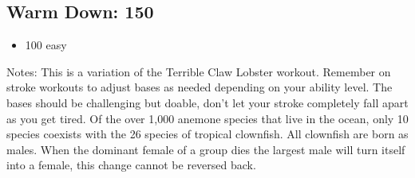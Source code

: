 \documentclass{swim}
\begin{document}
{\begin{minipage}[b][0.5\textheight][t]{0.95\textwidth}
\subsection{Warm Down: 150}
\begin{itemize}
  \item 100 easy
\end{itemize} 

Notes: This is a variation of the Terrible Claw Lobster workout. Remember on stroke workouts to adjust bases as needed depending on your ability level. The bases should be challenging but doable, don’t let your stroke completely fall apart as you get tired.
Of the over 1,000 anemone species that live in the ocean, only 10 species coexists with the 26 species of tropical clownfish. All clownfish are born as males. When the dominant female of a group dies the largest male will turn itself into a female, this change cannot be reversed back. 


\end{minipage}}
\end{document}
